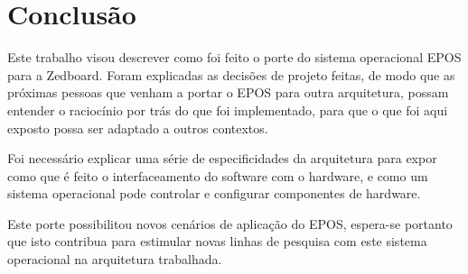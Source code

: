\chapter{Conclusão}



Este trabalho visou descrever como foi feito o porte do sistema operacional EPOS para a Zedboard. Foram explicadas as decisões de projeto feitas, de modo que as próximas pessoas que venham a portar o EPOS para outra arquitetura, possam entender o raciocínio por trás do que foi implementado, para que o que foi aqui exposto possa ser adaptado a outros contextos.

Foi necessário explicar uma série de especificidades da arquitetura para expor como que é feito o interfaceamento do software com o hardware, e como um sistema operacional pode controlar e configurar componentes de hardware.

Este porte possibilitou novos cenários de aplicação do EPOS, espera-se portanto que isto contribua para estimular novas linhas de pesquisa com este sistema operacional na arquitetura trabalhada.
